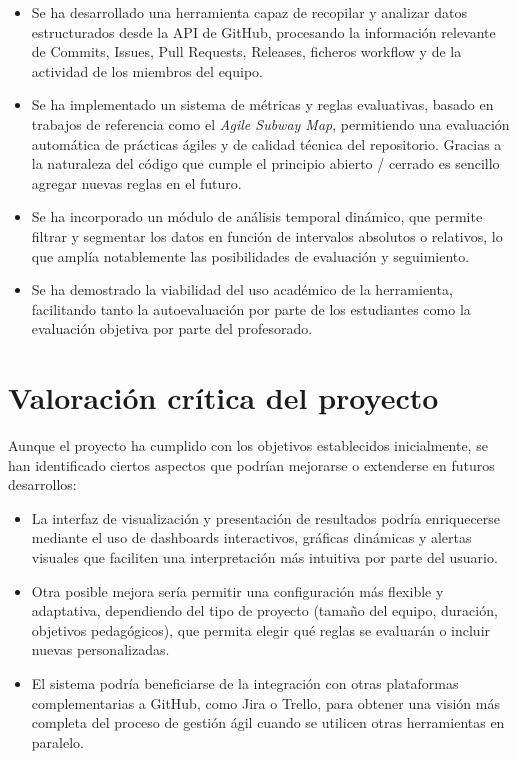 \begin{itemize}
\item Se ha desarrollado una herramienta capaz de recopilar y analizar datos estructurados desde la API de GitHub, procesando la información relevante de Commits, Issues, Pull Requests, Releases, ficheros workflow y de la actividad de los miembros del equipo.
\item Se ha implementado un sistema de métricas y reglas evaluativas, basado en trabajos de referencia como el \textit{Agile Subway Map}, permitiendo una evaluación automática de prácticas ágiles y de calidad técnica del repositorio. Gracias a la naturaleza del código que cumple el principio abierto / cerrado es sencillo agregar nuevas reglas en el futuro.
\item Se ha incorporado un módulo de análisis temporal dinámico, que permite filtrar y segmentar los datos en función de intervalos absolutos o relativos, lo que amplía notablemente las posibilidades de evaluación y seguimiento.
\item Se ha demostrado la viabilidad del uso académico de la herramienta, facilitando tanto la autoevaluación por parte de los estudiantes como la evaluación objetiva por parte del profesorado.
\end{itemize}

\section*{Valoración crítica del proyecto}

Aunque el proyecto ha cumplido con los objetivos establecidos inicialmente, se han identificado ciertos aspectos que podrían mejorarse o extenderse en futuros desarrollos:

\begin{itemize}
\item La interfaz de visualización y presentación de resultados podría enriquecerse mediante el uso de dashboards interactivos, gráficas dinámicas y alertas visuales que faciliten una interpretación más intuitiva por parte del usuario.
\item Otra posible mejora sería permitir una configuración más flexible y adaptativa, dependiendo del tipo de proyecto (tamaño del equipo, duración, objetivos pedagógicos), que permita elegir qué reglas se evaluarán o incluir nuevas personalizadas.
\item El sistema podría beneficiarse de la integración con otras plataformas complementarias a GitHub, como Jira o Trello, para obtener una visión más completa del proceso de gestión ágil cuando se utilicen otras herramientas en paralelo.
\end{itemize}

